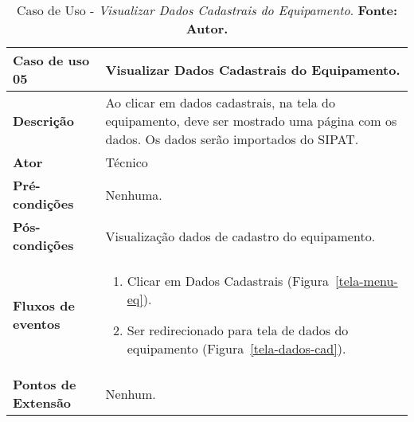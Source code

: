 \begin{apendicesenv}
\begin{table}[H]
\centering
\caption{Caso de Uso - \textit{Visualizar Dados Cadastrais do Equipamento}. \textbf{Fonte: Autor.}}
\label{uc05}
\begin{tabular}{ | p{5cm} | p{10cm} |  }
\hline
	\textbf{Caso de uso 05} & Visualizar Dados Cadastrais do Equipamento. \\ \hline
	\textbf{Descrição} & Ao clicar em dados cadastrais, na tela do equipamento, deve ser mostrado uma página com os dados. Os dados serão importados do SIPAT. \\ \hline
	\textbf{Ator} & Técnico \\ \hline
	\textbf{Pré-condições} & Nenhuma. \\ \hline
	\textbf{Pós-condições} & Visualização dados de cadastro do equipamento. \\ \hline
	\textbf{Fluxos de eventos} & \begin{enumerate}
									\item Clicar em Dados Cadastrais (Figura~\ref{tela-menu-eq}).    
									\item Ser redirecionado para tela de dados do equipamento (Figura~\ref{tela-dados-cad}).
								 \end{enumerate}   \\ \hline
	\textbf{Pontos de Extensão} & Nenhum. \\ \hline
\end{tabular}
\end{table}



\end{apendicesenv}
